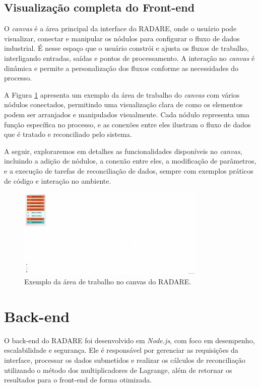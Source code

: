 \subsection{Visualização completa do Front-end}

O \textit{canvas} é a área principal da interface do RADARE, onde o usuário pode visualizar, conectar e manipular os nódulos para configurar o fluxo de dados industrial. É nesse espaço que o usuário constrói e ajusta os fluxos de trabalho, interligando entradas, saídas e pontos de processamento. A interação no \textit{canvas} é dinâmica e permite a personalização dos fluxos conforme as necessidades do processo.

A Figura \ref{Fig:CanvasArea} apresenta um exemplo da área de trabalho do \textit{canvas} com vários nódulos conectados, permitindo uma visualização clara de como os elementos podem ser arranjados e manipulados visualmente. Cada nódulo representa uma função específica no processo, e as conexões entre eles ilustram o fluxo de dados que é tratado e reconciliado pelo sistema.

A seguir, exploraremos em detalhes as funcionalidades disponíveis no \textit{canvas}, incluindo a adição de nódulos, a conexão entre eles, a modificação de parâmetros, e a execução de tarefas de reconciliação de dados, sempre com exemplos práticos de código e interação no ambiente.

\begin{figure}[htbp]
    \centering
    \includegraphics[width=0.8\textwidth]{figuras/empty-canvas.png}
    \caption{Exemplo da área de trabalho no canvas do RADARE.}
    \label{Fig:CanvasArea}
\end{figure}

\section{Back-end}

O back-end do RADARE foi desenvolvido em \textit{Node.js}, com foco em desempenho, escalabilidade e segurança. Ele é responsável por gerenciar as requisições da interface, processar os dados submetidos e realizar os cálculos de reconciliação utilizando o método dos multiplicadores de Lagrange, além de retornar os resultados para o front-end de forma otimizada.

